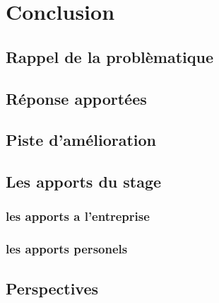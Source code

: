 \hypertarget{conclusion}{%
\chapter{Conclusion}\label{conclusion}}

\section{Rappel de la problèmatique}

\section{Réponse apportées}

\section{Piste d'amélioration}

\section{Les apports du stage}
\subsection{les apports a l'entreprise}

\subsection{les apports personels}


\section{Perspectives}
